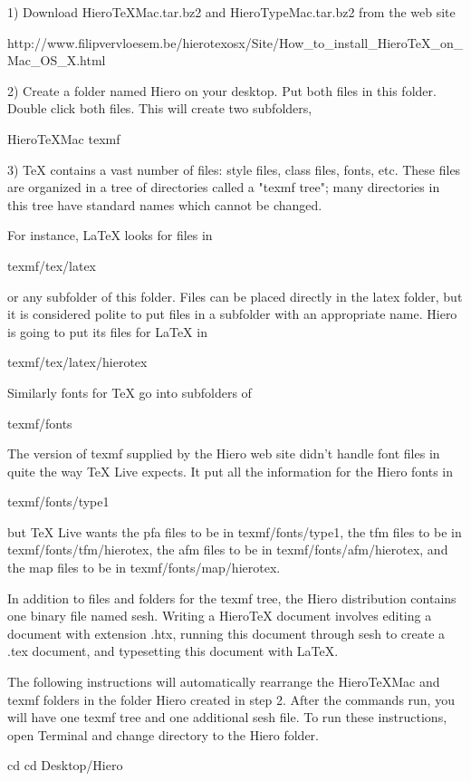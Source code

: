 1) Download HieroTeXMac.tar.bz2 and HieroTypeMac.tar.bz2 from the web site 

	http://www.filipvervloesem.be/hierotexosx/Site/How_to_install_HieroTeX_on_Mac_OS_X.html

2) Create a folder named Hiero on your desktop. Put both files in this folder. Double click both files. This will create two subfolders,

	HieroTeXMac
	texmf

3) TeX contains a vast number of files: style files, class files, fonts, etc. These files are organized in a tree of directories called a "texmf tree"; many directories in this tree have standard names which cannot be changed. 

For instance, LaTeX looks for files in

     texmf/tex/latex

or any subfolder of this folder. Files can be placed directly in the latex folder, but it is considered polite to put files in a subfolder with an appropriate name. Hiero is going to put its files for LaTeX in

     texmf/tex/latex/hierotex

Similarly fonts for TeX go into subfolders of

     texmf/fonts
     
The version of texmf supplied by the Hiero web site didn't handle font files in quite the way TeX Live expects. It put all the information for the Hiero fonts in 

     texmf/fonts/type1

but TeX Live wants the pfa files to be in texmf/fonts/type1, the tfm files to be in texmf/fonts/tfm/hierotex, the afm files to be in texmf/fonts/afm/hierotex, and the map files to be in texmf/fonts/map/hierotex.

In addition to files and folders for the texmf tree, the Hiero distribution contains one binary file named sesh. Writing a HieroTeX document involves editing a document with extension .htx, running this document through sesh to create a .tex document, and typesetting this document with LaTeX.

The following instructions will automatically rearrange the HieroTeXMac and texmf folders in the folder Hiero created in step 2. After the commands run, you will have one texmf tree and one additional sesh file. To run these instructions, open Terminal and change directory to the Hiero folder.

	cd 
	cd Desktop/Hiero
	
